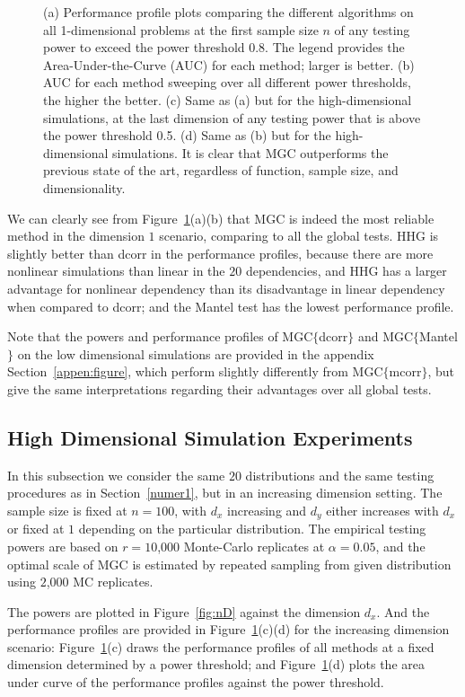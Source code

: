 \documentclass[11pt]{article}
\begin{document}
\begin{figure}[htbp]
{(a) Performance profile plots comparing the different algorithms on all 1-dimensional problems at the first sample size $n$ of any testing power to exceed the power threshold 0.8. The legend provides the Area-Under-the-Curve (AUC) for each method; larger is better.
(b) AUC for each method sweeping over all different power thresholds, the higher the better.
(c) Same as (a) but for the high-dimensional simulations, at the last dimension of any testing power that is above the power threshold 0.5.
(d) Same as (b) but for the high-dimensional simulations.
It is clear that MGC outperforms the previous state of the art, regardless of function, sample size, and dimensionality.}
\label{fig:pp}
\end{figure}

We can clearly see from Figure~\ref{fig:pp}(a)(b) that MGC is indeed the most reliable method in the dimension $1$ scenario, comparing to all the global tests. HHG is slightly better than dcorr in the performance profiles, because there are more nonlinear simulations than linear in the $20$ dependencies, and HHG has a larger advantage for nonlinear dependency than its disadvantage in linear dependency when compared to dcorr; and the Mantel test has the lowest performance profile. 

Note that the powers and performance profiles of MGC$\{$dcorr$\}$ and MGC$\{$Mantel$\}$ on the low dimensional simulations are provided in the appendix Section~\ref{appen:figure}, which perform slightly differently from MGC$\{$mcorr$\}$, but give the same interpretations regarding their advantages over all global tests.


\subsection{High Dimensional Simulation Experiments}
\label{numer2}
In this subsection we consider the same $20$ distributions and the same testing procedures as in Section~\ref{numer1}, but in an increasing dimension setting. The sample size is fixed at $n=100$, with $d_{x}$ increasing and $d_{y}$ either increases with $d_{x}$ or fixed at $1$ depending on the particular distribution. The empirical testing powers are based on $r=10$,$000$ Monte-Carlo replicates at $\alpha=0.05$, and the optimal scale of MGC is estimated by repeated sampling from given distribution using $2$,$000$ MC replicates. 

The powers are plotted in Figure~\ref{fig:nD} against the dimension $d_{x}$. And the performance profiles are provided in Figure~\ref{fig:pp}(c)(d) for the increasing dimension scenario: Figure~\ref{fig:pp}(c) draws the performance profiles of all methods at a fixed dimension determined by a power threshold; and Figure~\ref{fig:pp}(d) plots the area under curve of the performance profiles against the power threshold.
\end{document}
